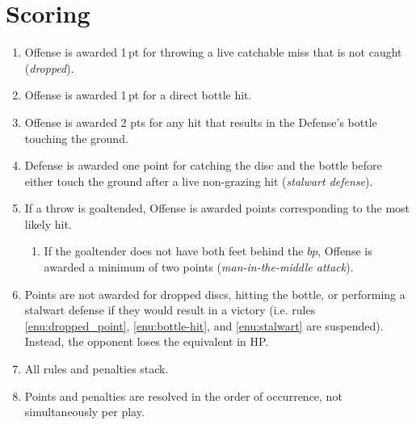 \documentclass[11pt,letterpaper,twocolumn,english,DIV=calc]{scrartcl}
\begin{document}
\section{Scoring}
\begin{enumerate}
	\item \label{enu:dropped_point}Offense is awarded 1\,pt for throwing a live catchable miss that is not caught (\emph{dropped}).
	\item \label{enu:bottle-hit}Offense is awarded 1\,pt for a direct bottle hit.
	\item Offense is awarded 2 pts for any hit that results in the Defense's bottle touching the ground.
	\item \label{enu:stalwart}Defense is awarded one point for catching the disc and the bottle before either touch the ground after a live non-grazing hit (\emph{stalwart defense}). 

	\item If a throw is goaltended, Offense is awarded points corresponding to the most likely hit.
	\begin{enumerate}
		\item If the goaltender does not have both feet behind the $bp$, Offense is awarded a minimum of two points (\emph{man-in-the-middle attack}).
	\end{enumerate}

	\item Points are not awarded for dropped discs, hitting the bottle, or performing a stalwart defense if they would result in a victory (i.e. rules \ref{enu:dropped_point}, \ref{enu:bottle-hit}, and \ref{enu:stalwart} are suspended). Instead, the opponent loses the equivalent in HP.

	\item All rules and penalties stack.
	\item Points and penalties are resolved in the order of occurrence, not simultaneously per play.
\end{enumerate}
\end{document}
